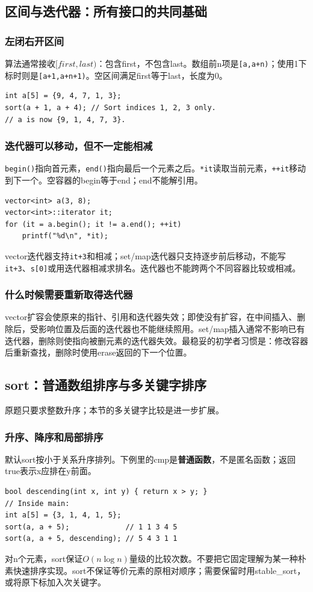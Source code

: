 \subsection{区间与迭代器：所有接口的共同基础}
\subsubsection{左闭右开区间}
算法通常接收$[first,last)$：包含first，不包含last。数组前n项是\texttt{[a,a+n)}；使用1下标时则是\texttt{[a+1,a+n+1)}。空区间满足first等于last，长度为0。
\begin{lstlisting}
int a[5] = {9, 4, 7, 1, 3};
sort(a + 1, a + 4); // Sort indices 1, 2, 3 only.
// a is now {9, 1, 4, 7, 3}.
\end{lstlisting}
\subsubsection{迭代器可以移动，但不一定能相减}
\texttt{begin()}指向首元素，\texttt{end()}指向最后一个元素之后。\texttt{*it}读取当前元素，\texttt{++it}移动到下一个。空容器的begin等于end；end不能解引用。
\begin{lstlisting}
vector<int> a(3, 8);
vector<int>::iterator it;
for (it = a.begin(); it != a.end(); ++it)
    printf("%d\n", *it);
\end{lstlisting}
vector迭代器支持\texttt{it+3}和相减；set/map迭代器只支持逐步前后移动，不能写\texttt{it+3}、\texttt{s[0]}或用迭代器相减求排名。迭代器也不能跨两个不同容器比较或相减。

\subsubsection{什么时候需要重新取得迭代器}
vector扩容会使原来的指针、引用和迭代器失效；即使没有扩容，在中间插入、删除后，受影响位置及后面的迭代器也不能继续照用。set/map插入通常不影响已有迭代器，删除则使指向被删元素的迭代器失效。最稳妥的初学者习惯是：修改容器后重新查找，删除时使用erase返回的下一个位置。

\subsection{sort：普通数组排序与多关键字排序}
原题只要求整数升序；本节的多关键字比较是进一步扩展。

\subsubsection{升序、降序和局部排序}
默认sort按小于关系升序排列。下例里的cmp是\textbf{普通函数}，不是匿名函数；返回true表示x应排在y前面。
\begin{lstlisting}
bool descending(int x, int y) { return x > y; }
// Inside main:
int a[5] = {3, 1, 4, 1, 5};
sort(a, a + 5);             // 1 1 3 4 5
sort(a, a + 5, descending); // 5 4 3 1 1
\end{lstlisting}
对n个元素，sort保证$O(n\log n)$量级的比较次数。不要把它固定理解为某一种朴素快速排序实现。sort不保证等价元素的原相对顺序；需要保留时用stable\_sort，或将原下标加入次关键字。

